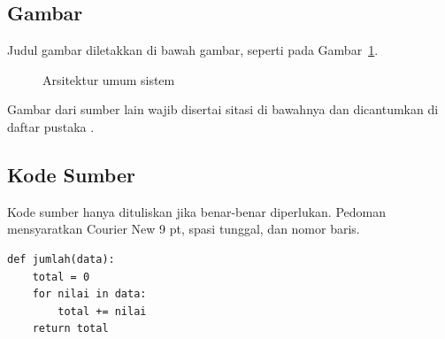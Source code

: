 \subsection{Gambar}
Judul gambar diletakkan di bawah gambar, seperti pada Gambar~\ref{fig:arsitektur}.
\begin{figure}[htbp]
  \centering
  \caption{Arsitektur umum sistem}
  \label{fig:arsitektur}
\end{figure}

Gambar dari sumber lain wajib disertai sitasi di bawahnya dan dicantumkan di
daftar pustaka \cite{goodfellow2016deep}.

\subsection{Kode Sumber}
Kode sumber hanya dituliskan jika benar-benar diperlukan. Pedoman mensyaratkan
Courier New 9 pt, spasi tunggal, dan nomor baris.
\begin{lstlisting}[caption={Fungsi iteratif}]
def jumlah(data):
    total = 0
    for nilai in data:
        total += nilai
    return total
\end{lstlisting}
